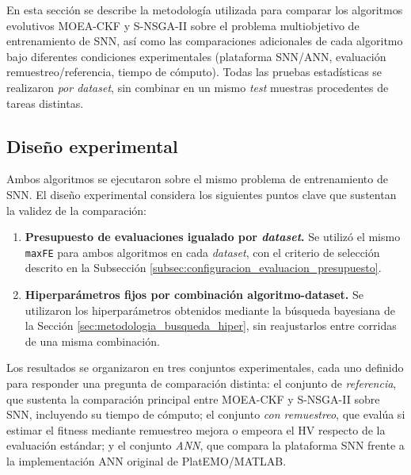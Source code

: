 En esta sección se describe la metodología utilizada para comparar los algoritmos evolutivos MOEA-CKF y S-NSGA-II sobre el problema multiobjetivo de entrenamiento de SNN, así como las comparaciones adicionales de cada algoritmo bajo diferentes condiciones experimentales (plataforma SNN/ANN, evaluación remuestreo/referencia, tiempo de cómputo). Todas las pruebas estadísticas se realizaron \emph{por dataset}, sin combinar en un mismo \textit{test} muestras procedentes de tareas distintas.

\subsection{Diseño experimental}

Ambos algoritmos se ejecutaron sobre el mismo problema de entrenamiento de SNN. El diseño experimental considera los siguientes puntos clave que sustentan la validez de la comparación:

\begin{enumerate}
    \item \textbf{Presupuesto de evaluaciones igualado por \textit{dataset}.} Se utilizó el mismo \texttt{maxFE} para ambos algoritmos en cada \textit{dataset}, con el criterio de selección descrito en la Subsección \ref{subsec:configuracion_evaluacion_presupuesto}.
    \item \textbf{Hiperparámetros fijos por combinación algoritmo-dataset.} Se utilizaron los hiperparámetros obtenidos mediante la búsqueda bayesiana de la Sección \ref{sec:metodologia_busqueda_hiper}, sin reajustarlos entre corridas de una misma combinación.
\end{enumerate}

Los resultados se organizaron en tres conjuntos experimentales, cada uno definido para responder una pregunta de comparación distinta: el conjunto de \textit{referencia}, que sustenta la comparación principal entre MOEA-CKF y S-NSGA-II sobre SNN, incluyendo su tiempo de cómputo; el conjunto \textit{con remuestreo}, que evalúa si estimar el fitness mediante remuestreo mejora o empeora el HV respecto de la evaluación estándar; y el conjunto \textit{ANN}, que compara la plataforma SNN frente a la implementación ANN original de PlatEMO/MATLAB.

